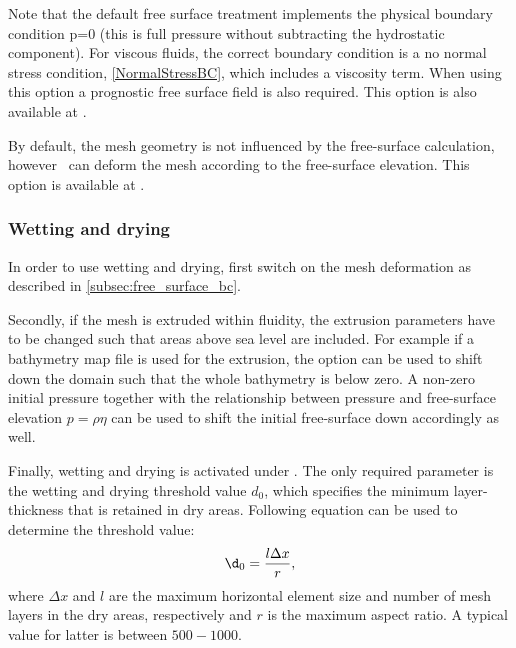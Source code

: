Note that the default free surface treatment implements the physical boundary
condition p=0 (this is full pressure without subtracting the hydrostatic
component). For viscous fluids, the correct boundary condition is a no normal
stress condition, \eqref{NormalStressBC}, which includes a viscosity term. When using this option a prognostic free surface field is also required. This option is also available at . 

By default, the mesh geometry is not influenced by the free-surface calculation, however \fluidity\ can deform the mesh according to the free-surface elevation. 
This option is available at .

\subsubsection{Wetting and drying}\label{subsec:wetting_drying_bc}

In order to use wetting and drying, first switch on the mesh deformation as described in \ref{subsec:free_surface_bc}.

Secondly, if the mesh is extruded within fluidity, the extrusion parameters have to be changed such that areas above sea level are included.
For example if a bathymetry map file is used for the extrusion, the option 
can be used to shift down the domain such that the whole bathymetry is below zero.
A non-zero initial pressure together with the relationship between pressure and free-surface elevation $p = \rho \eta$ can be used to shift the initial free-surface down accordingly as well.

Finally, wetting and drying is activated under .
The only required parameter is the wetting and drying threshold value $d_0$, which specifies the minimum layer-thickness that is retained in dry areas. 
Following equation can be used to determine the threshold value:
\begin{equation*}
\d_0 = \frac{l\Delta x}{r},
\end{equation*}
where $\Delta x$ and $l$ are the maximum horizontal element size and number of mesh layers in the dry areas, respectively and $r$ is the maximum aspect ratio. A typical value for latter is between $500-1000$.


